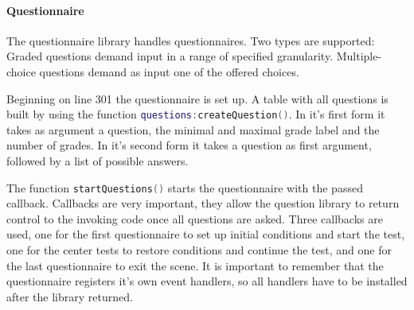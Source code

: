 \paragraph{Questionnaire}
The questionnaire library handles questionnaires.
Two types are supported:
Graded questions demand input in a range of specified granularity.
Multiple-choice questions demand as input one of the offered choices.

Beginning on line 301 the questionnaire is set up.
A table with all questions is built by using the function \lstinline[language=lua]{questions:createQuestion()}.
In it's first form it takes as argument a question, the minimal and maximal grade label and the number of grades.
In it's second form it takes a question as first argument, followed by a list of possible answers.

The function \lstinline[language=lua]{startQuestions()} starts the questionnaire with the passed callback.
Callbacks are very important, they allow the question library to return control to the invoking code once all questions are asked.
Three callbacks are used, one for the first questionnaire to set up initial conditions and start the test, one for the center tests to restore conditions and continue the test, and one for the last questionnaire to exit the scene.
It is important to remember that the questionnaire registers it's own event handlers, so all handlers have to be installed after the library returned.

